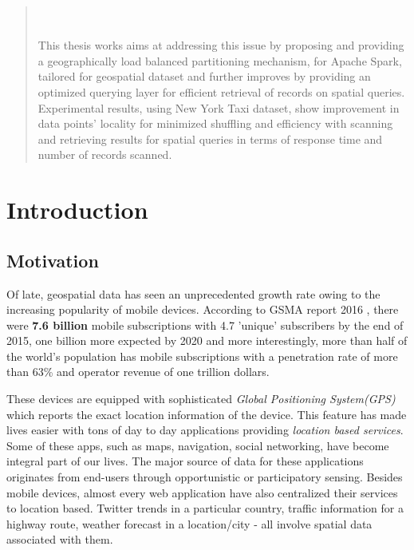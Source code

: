\documentclass[article,type=msc,colorback,12pt,accentcolor=tud1d]{tudthesis}
\begin{document}
\begin{abstract}
		 \\ \\
		  This thesis works aims at addressing this issue by proposing and providing a geographically load balanced partitioning mechanism, for Apache Spark, tailored for geospatial dataset and further improves by providing an optimized querying layer for efficient retrieval of records on spatial queries. Experimental results, using New York Taxi dataset, show  improvement in data points' locality for minimized shuffling and efficiency with scanning and retrieving results for spatial queries in terms of response time and number of records scanned.\cite{sparkbook}
		

\end{abstract}  

\clearpage



\setlength{ \parskip }{1em}
\tableofcontents 
\cleardoublepage 

\listoffigures
\clearpage
\appendix
\cleardoublepage 

	\hfill
	
  \section{Introduction}
  \hfill \break
 
		\subsection{Motivation}
		
		\par Of late, geospatial data has seen an unprecedented growth rate owing to the increasing popularity of mobile devices. According to GSMA report 2016 \cite{GSMA_REPORT_2016}, there were \textbf{7.6 billion} mobile subscriptions with 4.7 'unique' subscribers by the end of 2015, one billion more expected by 2020 and more interestingly, more than half of the world's population has mobile subscriptions with a penetration rate of more than 63\% and operator revenue of one trillion dollars.
		
		These devices are equipped with sophisticated \textit{Global Positioning System(GPS)} which reports the exact location information of the device. This feature has made lives easier with tons of day to day applications providing \textit{location based services}. Some of these apps, such as maps, navigation, social networking, have become integral part of our lives. The major source of data for these applications originates from end-users through opportunistic or participatory sensing. Besides mobile devices, almost every web application have also centralized their services to location based. Twitter trends in a particular country, traffic information for a highway route, weather forecast in a location/city - all involve spatial data associated with them. 
		
\end{document}
